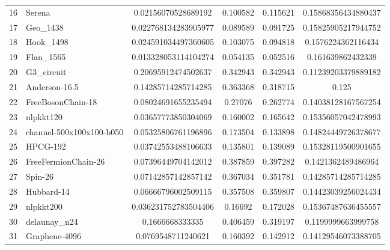 \begin{tabular}{|l|l|S[round-mode=places,round-precision=4]|S[round-mode=places,round-precision=4]|S[round-mode=places,round-precision=4]|S[round-mode=places,round-precision=4]|}
{16}& {	Serena                    }	& 0.02156070528689192	& 0.100582	& 0.115621	& 0.15868356434880437	\\
{17}& {	Geo\_1438                  }	& 0.022768134283905977	& 0.089589	& 0.091725	& 0.15825905217944752	\\
{18}& {	Hook\_1498                 }	& 0.024591034497360605	& 0.103075	& 0.094818	& 0.1576224362116434	\\
{19}& {	Flan\_1565                 }	& 0.013328053114104274	& 0.054135	& 0.052516	& 0.161639862432339	\\
{20}& {	G3\_circuit                }	& 0.20695912474502637	& 0.342943	& 0.342943	& 0.11239203379889182	\\
{21}& {	Anderson-16.5             }	& 0.14285714285714285	& 0.363368	& 0.318715	& 0.125	\\
{22}& {	FreeBosonChain-18         }	& 0.08024691655235494	& 0.27076	& 0.262774	& 0.14038128167567254	\\
{23}& {	nlpkkt120                 }	& 0.03657773850304069	& 0.160002	& 0.165642	& 0.15356057042478993	\\
{24}& {	channel-500x100x100-b050  }	& 0.05325806761196896	& 0.173504	& 0.133898	& 0.14824449726378677	\\
{25}& {	HPCG-192                  }	& 0.03742553488106633	& 0.135801	& 0.139089	& 0.15328119500901655	\\
{26}& {	FreeFermionChain-26       }	& 0.07396449704142012	& 0.387859	& 0.397282	& 0.1421362489486964	\\
{27}& {	Spin-26                   }	& 0.07142857142857142	& 0.367034	& 0.351781	& 0.14285714285714285	\\
{28}& {	Hubbard-14                }	& 0.06666796002509115	& 0.357508	& 0.359807	& 0.14423039256024434	\\
{29}& {	nlpkkt200                 }	& 0.036231752783504406	& 0.16692	& 0.172028	& 0.15367487636455557	\\
{30}& {	delaunay\_n24              }	& 0.1666668333335	& 0.406459	& 0.319197	& 0.1199999663999758	\\
{31}& {	Graphene-4096             }	& 0.0769548711240621	& 0.160392	& 0.142912	& 0.14129546073388705	\\
\bottomrule
\end{tabular}


